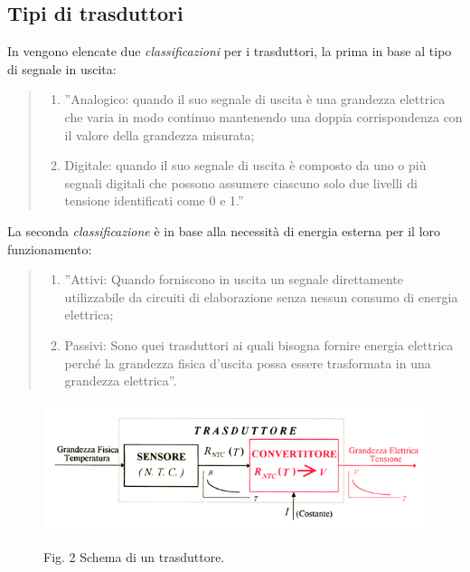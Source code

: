 \documentclass[a4paper]{report} %
\begin{document}
\subsection{Tipi di trasduttori}
In \cite{art:rif.11} vengono elencate due \textit{classificazioni} per i trasduttori, la prima in base al tipo di segnale in uscita:
\begin{quote}	
	\begin{enumerate}
		\item ''Analogico: quando il suo segnale di uscita è una grandezza elettrica che varia in modo continuo mantenendo una doppia corrispondenza con il valore della grandezza misurata;
		\item Digitale: quando il suo segnale di uscita è composto da uno o più segnali digitali che possono assumere ciascuno solo due livelli di tensione identificati come 0 e 1.''
	\end{enumerate}
\end{quote}
La seconda \textit{classificazione} è in base alla necessità di energia esterna per il loro funzionamento:
\begin{quote}
	\begin{enumerate}
		\item ''Attivi: Quando forniscono in uscita un segnale direttamente utilizzabile da circuiti di elaborazione senza nessun consumo di energia elettrica;
		\item Passivi: Sono quei trasduttori ai quali bisogna fornire energia elettrica perché la grandezza fisica d'uscita possa essere trasformata in una grandezza elettrica''. 
	\end{enumerate}
\end{quote}

\begin{figure}
\centering
\includegraphics[scale=.7]{Immagini/trasduttore.png}

Fig. 2 Schema di un trasduttore. \cite{art:rif.33}
\end{figure}
\end{document}
